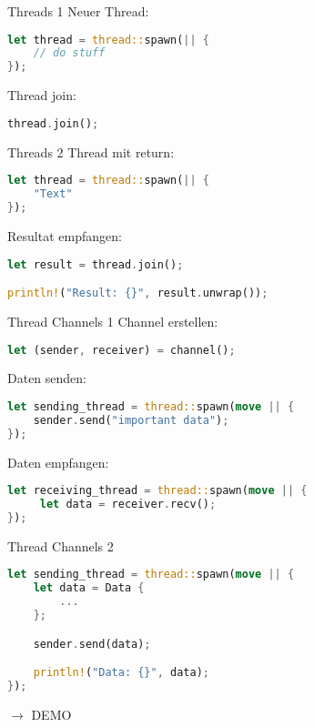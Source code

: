 
\begin{frame}[fragile,t]{Threads 1}
    Neuer Thread:
    \begin{lstlisting}[language=Rust,escapechar=@,label={lst:threads1-1}]
let thread = thread::spawn(|| {
    // do stuff
});\end{lstlisting}

    \pause
    Thread join:
    \begin{lstlisting}[language=Rust,escapechar=@,label={lst:threads1-2}]
thread.join();
\end{lstlisting}

\end{frame}

\begin{frame}[fragile,t]{Threads 2}
    Thread mit return:
    \begin{lstlisting}[language=Rust,escapechar=@,label={lst:threads2-1}]
let thread = thread::spawn(|| {
    "Text"
});\end{lstlisting}

    \pause
    Resultat empfangen:
    \begin{lstlisting}[language=Rust,escapechar=@,label={lst:threads2-2}]
let result = thread.join();

println!("Result: {}", result.unwrap());
    \end{lstlisting}

\end{frame}

\begin{frame}[fragile,t]{Thread Channels 1}
    Channel erstellen:
    \begin{lstlisting}[language=Rust,escapechar=@,label={lst:thread-channels-1-1}]
let (sender, receiver) = channel();
\end{lstlisting}

    \pause
    Daten senden:
    \begin{lstlisting}[language=Rust,escapechar=@,label={lst:thread-channels-1-2}]
let sending_thread = thread::spawn(move || {
    sender.send("important data");
});\end{lstlisting}

    \pause
    Daten empfangen:
    \begin{lstlisting}[language=Rust,escapechar=@,label={lst:thread-channels-1-3}]
let receiving_thread = thread::spawn(move || {
     let data = receiver.recv();
});\end{lstlisting}
\end{frame}

\begin{frame}[fragile,t]{Thread Channels 2}
    \begin{lstlisting}[language=Rust,escapechar=@,label={lst:thread-channels-2-1}]
let sending_thread = thread::spawn(move || {
    let data = Data {
        ...
    };

    sender.send(data);

    println!("Data: {}", data);
});\end{lstlisting}

    \pause
    $\longrightarrow$ DEMO
\end{frame}
